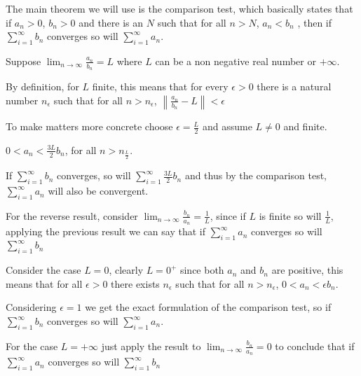 \documentclass[12pt]{article}
\begin{document}
The main theorem we will use is the comparison test, which basically states that if $a_n>0$, $b_n>0$ and there is an $N$ such that for all $n>N$, $a_n < b_n$ , then if $\sum_{i=1}^\infty b_n$ converges so will $\sum_{i=1}^\infty a_n$.

Suppose $\lim_{n\to \infty} \frac{a_n}{b_n} = L$ where $L$ can be a non negative real number or $+\infty$.

By definition, for $L$ finite, this means that for every $\epsilon>0$ there is a natural number $n_\epsilon$ such that for all $n > n_\epsilon$, $\left\| \frac{a_n}{b_n} -L \right \| < \epsilon$

To make matters more concrete choose $\epsilon = \frac{L}{2}$ and assume $L\ne0$ and finite.

$0< a_n < \frac{3L}{2} b_n $, for all $n > n_{\frac{L}{2}}$.

If $\sum_{i=1}^\infty b_n$ converges, so will $\sum_{i=1}^\infty \frac{3L}{2} b_n$ and thus by the comparison test, $\sum_{i=1}^\infty a_n$ will also be convergent.

For the reverse result, consider $\lim_{n \to \infty} \frac{b_n}{a_n} = \frac{1}{L}$, since if $L$ is finite so will $\frac{1}{L}$, applying the previous result we can say that if $\sum_{i=1}^\infty a_n$ converges so will $\sum_{i=1}^\infty b_n$

Consider the case $L=0$, clearly $L=0^+$ since both $a_n$ and $b_n$ are positive, this means that for all $\epsilon > 0$ there exists $n_\epsilon$ such that for all $n>n_\epsilon$, $0<a_n<\epsilon b_n$.

Considering $\epsilon=1$ we get the exact formulation of the comparison test, so if $\sum_{i=1}^\infty b_n$ converges so will $\sum_{i=1}^\infty a_n$.

For the case $L=+\infty$ just apply the result to $\lim_{n \to \infty} \frac{b_n}{a_n} = 0$ to conclude that if $\sum_{i=1}^\infty a_n$ converges so will $\sum_{i=1}^\infty b_n$
\end{document}
